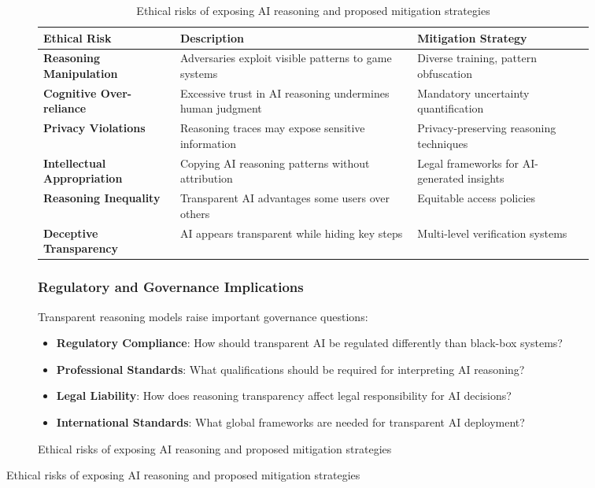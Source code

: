 \begin{figure}[H]
\begin{table}[H]
\begin{figure}[H]
\begin{table}[H]
\begin{table}[H]
\centering
\begin{tabular}{lp{4.5cm}p{4.5cm}}
\toprule
Ethical Risk & Description & Mitigation Strategy \\
\midrule
\textbf{Reasoning Manipulation} & Adversaries exploit visible patterns to game systems & Diverse training, pattern obfuscation \\
\textbf{Cognitive Over-reliance} & Excessive trust in AI reasoning undermines human judgment & Mandatory uncertainty quantification \\
\textbf{Privacy Violations} & Reasoning traces may expose sensitive information & Privacy-preserving reasoning techniques \\
\textbf{Intellectual Appropriation} & Copying AI reasoning patterns without attribution & Legal frameworks for AI-generated insights \\
\textbf{Reasoning Inequality} & Transparent AI advantages some users over others & Equitable access policies \\
\textbf{Deceptive Transparency} & AI appears transparent while hiding key steps & Multi-level verification systems \\
\bottomrule
\end{tabular}
\caption{Ethical risks of exposing AI reasoning and proposed mitigation strategies}
\label{tab:ethical-challenges}
\end{table}

\subsubsection{Regulatory and Governance Implications}

Transparent reasoning models raise important governance questions:

\begin{itemize}
    \item \textbf{Regulatory Compliance}: How should transparent AI be regulated differently than black-box systems?
    \item \textbf{Professional Standards}: What qualifications should be required for interpreting AI reasoning?
    \item \textbf{Legal Liability}: How does reasoning transparency affect legal responsibility for AI decisions?
    \item \textbf{International Standards}: What global frameworks are needed for transparent AI deployment?
\end{itemize}


\end{table}
\end{figure}
\end{table}
\end{figure}
